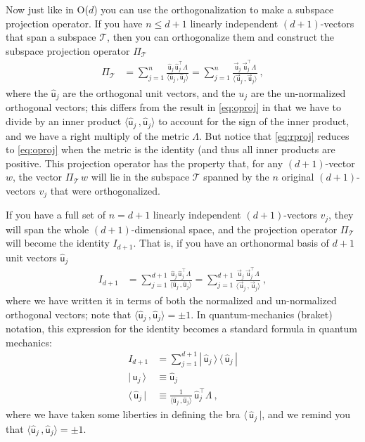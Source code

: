 \documentclass{article}
\newcommand\upvec[1]{\!\vec{\,\mathrm{#1}}}
\newcommand{\Lvec}[1]{\upvec{\mathsf{#1}}} %
\newcommand{\Lhat}[1]{\hat{\mathsf{#1}}} %
\newcommand{\inner}[2]{\langle{#1}\,,{#2}\rangle}
\newcommand{\bra}[1]{\langle\,{#1}\,|}
\newcommand{\ket}[1]{|\,{#1}\,\rangle}
\newcommand{\ketbra}[2]{|\,{#1}\,\rangle\,\langle\,{#2}\,|}
\newcommand{\plus}{\!+\!} %
\begin{document}
Now just like in O($d$) you can use the orthogonalization to make a subspace projection operator.
If you have $n\leq d+1$ linearly independent $(d\plus1)$-vectors that span a subspace $\mathscr{T}$, then you can orthogonalize them and construct the subspace projection operator $\Pi_\mathscr{T}$
\begin{align}\label{eq:rproj}
    \Pi_\mathscr{T} &= \sum_{j=1}^n \frac{\Lhat{u}_j\,\Lhat{u}_j^\top\Lambda}{\inner{\Lhat{u}_j}{\Lhat{u}_j}} = \sum_{j=1}^n \frac{\Lvec{u}_j\,\Lvec{u}_j^\top\Lambda}{\inner{\Lvec{u}_j}{\Lvec{u}_j}} ~,
\end{align}
where the $\Lhat{u}_j$ are the orthogonal unit vectors, and the $u_j$ are the un-normalized orthogonal vectors; this differs from the result in \eqref{eq:oproj} in that we have to divide by an inner product $\inner{\Lhat{u}_j}{\Lhat{u}_j}$ to account for the sign of the inner product, and we have a right multiply of the metric $\Lambda$.
But notice that \eqref{eq:rproj} reduces to \eqref{eq:oproj} when the metric is the identity (and thus all inner products are positive.
This projection operator has the property that, for any $(d\plus1)$-vector $w$, the vector $\Pi_\mathscr{T}\,w$ will lie in the subspace $\mathscr{T}$ spanned by the $n$ original $(d\plus1)$-vectors $v_j$ that were orthogonalized.

If you have a full set of $n=d+1$ linearly independent $(d\plus1)$-vectors $v_j$, they will span the whole $(d\plus1)$-dimensional space, and the projection operator $\Pi_\mathscr{T}$ will become the identity $I_{d\plus1}$.
That is, if you have an orthonormal basis of $d+1$ unit vectors $\Lhat{u}_j$
\begin{align}
    I_{d\plus1} &= \sum_{j=1}^{d+1} \frac{\Lhat{u}_j\,\Lhat{u}_j^\top\Lambda}{\inner{\Lhat{u}_j}{\Lhat{u}_j}} = \sum_{j=1}^{d+1} \frac{\Lvec{u}_j\,\Lvec{u}_j^\top\Lambda}{\inner{\Lvec{u}_j}{\Lvec{u}_j}} ~,
\end{align}
where we have written it in terms of both the normalized and un-normalized orthogonal vectors; note that $\inner{\Lhat{u}_j}{\Lhat{u}_j}=\pm 1$.
In quantum-mechanics (braket) notation, this expression for the identity becomes a standard formula in quantum mechanics:
\begin{align}
    I_{d\plus1} &= \sum_{j=1}^{d+1} \ketbra{\Lhat{u}_j}{\Lhat{u}_j}
    \\
    \ket{\Lhat{u}_j} &\equiv \Lhat{u}_j\label{eq:Lket}
    \\
    \bra{\Lhat{u}_j} &\equiv \frac{1}{\inner{\Lhat{u}_j}{\Lhat{u}_j}}\,\Lhat{u}_j^\top\Lambda ~,\label{eq:Lbra}
\end{align}
where we have taken some liberties in defining the bra $\bra{\Lhat{u}_j}$, and we remind you that $\inner{\Lhat{u}_j}{\Lhat{u}_j}=\pm 1$.
\end{document}
